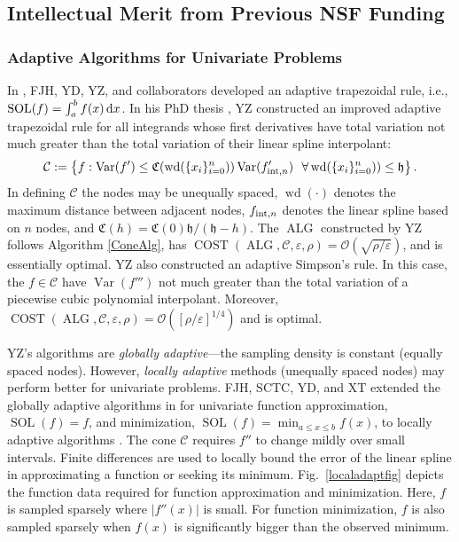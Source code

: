 \documentclass[11pt]{NSFamsart}
\DeclareMathOperator{\cost}{COST}
\DeclareMathOperator{\size}{wd}
\newcommand{\hcut}{\mathfrak{h}}
\DeclareMathOperator{\Var}{Var}
\DeclareMathOperator{\SOL}{SOL}
\DeclareMathOperator{\ALG}{ALG}
\def\dif{\textup{d}}
\newcommand{\cc}{\mathcal{C}}
\newcommand{\fC}{\mathfrak{C}}
\newcommand{\Order}{\mathcal{O}}
\newcommand{\inflate}{\fC}
\begin{document}
\subsection{Intellectual Merit from Previous NSF Funding}
\label{previousmeritsubsec}

\subsubsection{Adaptive Algorithms for Univariate Problems} \label{sec:localadpat}
In \cite{HicEtal14b}, FJH, YD, YZ, and collaborators developed an adaptive trapezoidal rule, i.e., $\SOL(f) = \int_a^b f(x) \, \dif x$.  In his PhD thesis \cite{Zha18a}, YZ constructed an improved adaptive trapezoidal rule for all integrands whose first derivatives have total variation not much greater than the total variation of their linear spline interpolant:
\[
\cc: = \left \{ f : \Var(f') \le \inflate(\size(\{x_i\}_{i=0}^n)) \Var(f'_{\textup{int},n}) \ \ \forall \size(\{x_i\}_{i=0}^n)) \le \hcut \right\}.
\]
In defining $\cc$ the nodes may be unequally spaced, $\size(\cdot)$ denotes the maximum distance between adjacent nodes, $f_{\textup{int},n}$ denotes the linear spline based on $n$ nodes, and $\inflate(h) = \inflate(0) \hcut/(\hcut - h)$.  The $\ALG$ constructed by YZ follows Algorithm \ref{ConeAlg}, has  $\cost(\ALG,\cc,\varepsilon, \rho) =  \Order(\sqrt{\rho/\varepsilon})$, and is essentially optimal.  YZ also constructed an adaptive Simpson's rule.  In this case, the $f \in \cc$ have $\Var(f''')$ not much greater than the total variation of a piecewise cubic polynomial interpolant.  Moreover,  $\cost(\ALG,\cc,\varepsilon, \rho) =  \Order([\rho/\varepsilon]^{1/4})$ and is optimal.  

YZ's algorithms are \emph{globally adaptive}---the sampling density is constant (equally spaced nodes).  However, \emph{locally adaptive} methods (unequally spaced nodes) may perform better for univariate problems.  FJH, SCTC, YD, and XT extended the globally adaptive algorithms in \cite{HicEtal14b,Ton14a} for univariate function approximation, $\SOL(f) = f$, and minimization, $\SOL(f) = \min_{a \le x \le b} f(x)$, to locally adaptive algorithms \cite{ChoEtal17a}.  The cone $\cc$ requires $f''$ to change mildly over small intervals.  Finite differences are used to locally bound the error of the linear spline in approximating a function or seeking its minimum. Fig.\ 
\ref{localadaptfig} depicts the function data required for function approximation and minimization.  Here, $f$ is 
sampled sparsely where $|f''(x)|$ is small. For function minimization, $f$ is also sampled sparsely when $f(x)$ is significantly bigger than the observed minimum.
\end{document}
